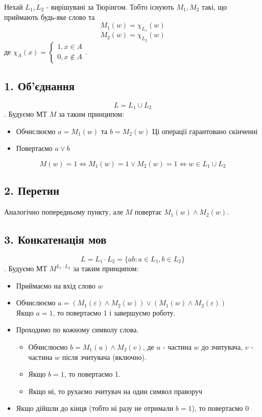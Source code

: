 \documentclass[11pt, a4paper]{article} %
\begin{document}
Нехай $L_1, L_2$ - вирішувані за Тюрiнгом.
Тобто існують $M_1, M_2$ такі, що приймають будь-яке слово та
$$M_1(w) = \chi_{L_1}(w)$$
$$M_2(w) = \chi_{L_2}(w)$$
де $\chi_A(x) = \begin{cases}
    1, x\in A\\
    0, x\notin A
\end{cases}$.

\subsection*{1. Об'єднання}
$$L = L_1 \cup L_2$$.
Будуємо МТ $M$ за таким принципом:
\begin{itemize}
    \item Обчислюємо $a=M_1(w)$ та $b=M_2(w)$
    \subitem Ці операції гарантовано скінченні
    \item Повертаємо $a \vee b$ 
\end{itemize}

$$M(w) = 1 \iff M_1(w) = 1 \vee M_2(w) = 1 \iff w \in L_1 \cup L_2$$
\qedsymbol

\subsection*{2. Перетин}
Аналогічно попередньому пункту, але $M$ повертає $M_1(w) \wedge M_2(w)$.
\qedsymbol

\subsection*{3. Конкатенація мов}
$$L = L_1 \cdot L_2 = \{ab : a \in L_1, b \in L_2\}$$.
Будуємо МТ $M^{L_1 \cdot L_2}$ за таким принципом:
\begin{itemize}
    \item Приймаємо на вхід слово $w$
    \item Обчислюємо $a = \left(M_1(\varepsilon) \wedge M_2(w)\right) \vee \left(M_1(w) \wedge M_2(\varepsilon)\right)$\\    
    Якщо $a = 1$, то повертаємо 1 і завершуємо роботу.
    \item Проходимо по кожному символу слова.\\
    \begin{itemize}
        \item Обчислюємо $b = M_1(u) \wedge M_2(v)$, де $u$ - частина $w$ до зчитувача, $v$ - частина $w$ після зчитувача (включно).
        \item Якщо $b = 1$, то повертаємо 1.
        \item Якщо ні, то рухаємо зчитувач на один символ праворуч
    \end{itemize}
    \item Якщо дійшли до кінця (тобто ні разу не отримали $b=1$), то повертаємо 0
\end{itemize}
\end{document}

